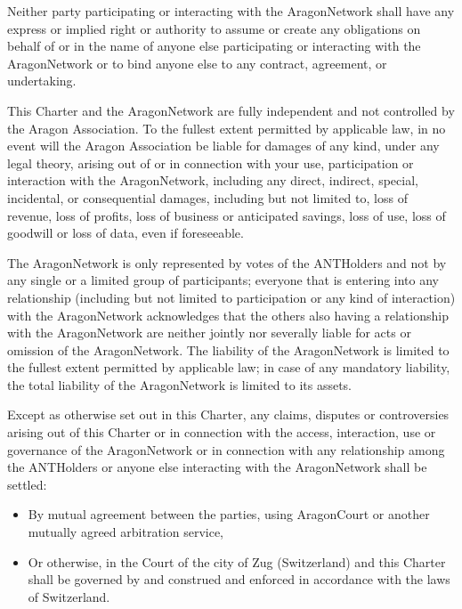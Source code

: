 Neither party participating or interacting with the \gls{AragonNetwork} shall have any 
express or implied right or authority to assume or create any obligations on behalf of or in the name of anyone else participating or interacting with the \gls{AragonNetwork} or to bind anyone else to any contract, agreement, or undertaking.

This Charter and the \gls{AragonNetwork} are fully independent and not controlled by the Aragon Association.
To the fullest extent permitted by applicable law, in no event will the Aragon Association be liable for damages of any kind, under any legal theory, arising out of or in connection with your use, participation or interaction with the \gls{AragonNetwork}, including any direct, indirect, special, incidental, or consequential damages, including but not limited to, loss of revenue, loss of profits, loss of business or anticipated savings, loss of use, loss of goodwill or loss of data, even if foreseeable.

The \gls{AragonNetwork} is only represented by votes of the \glspl{ANTHolder} and not by any single or a limited group of participants; 
everyone that is entering into any relationship (including but not limited to participation or any kind of interaction) with the \gls{AragonNetwork} acknowledges that the others also having a relationship with the \gls{AragonNetwork} are neither jointly nor severally liable for acts or omission of the \gls{AragonNetwork}.
The liability of the \gls{AragonNetwork} is limited to the fullest extent permitted by applicable law; in case of any mandatory liability, the total liability of the \gls{AragonNetwork} is limited to its assets.

Except as otherwise set out in this Charter, any claims, disputes or controversies arising out of this Charter or in connection with the access, interaction, use or governance of the \gls{AragonNetwork} or in connection with any relationship among the \glspl{ANTHolder} or anyone else interacting with the \gls{AragonNetwork} shall be settled:
\begin{itemize}
	\item By mutual agreement between the parties, using \gls{AragonCourt} or another mutually agreed arbitration service,
	\item Or otherwise, in the Court of the city of Zug (Switzerland) and this Charter shall be governed by and construed and enforced in accordance with the laws of Switzerland.
\end{itemize}

